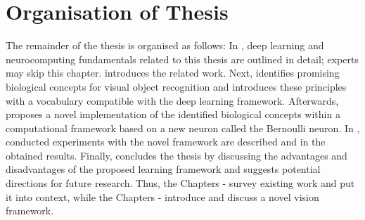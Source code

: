 \section{Organisation of Thesis}
The remainder of the thesis is organised as follows: In , deep learning and neurocomputing fundamentals related to this thesis are outlined in detail; experts may skip this chapter.
 introduces the related work. Next,  identifies promising biological concepts for visual object recognition and introduces these principles with a vocabulary compatible with the deep learning framework.
Afterwards,  proposes a novel implementation of the identified biological concepts within a computational framework based on a new neuron called the Bernoulli neuron.
In , conducted experiments with the novel framework are described and in  the obtained results.
Finally,  concludes the thesis by discussing the advantages and disadvantages of the proposed learning framework and suggests potential directions for future research.
Thus, the Chapters - survey existing work and put it into context, while the Chapters - introduce and discuss a novel vision framework.
